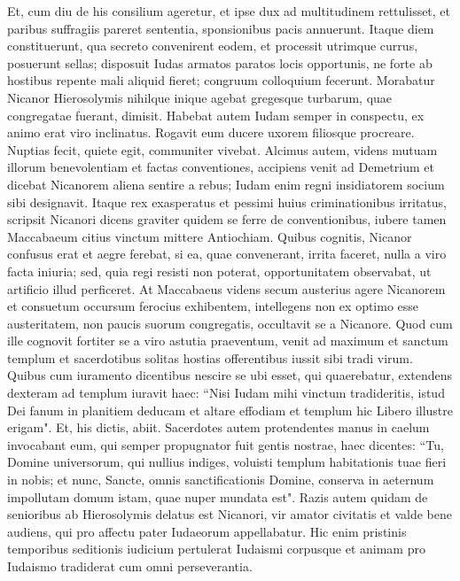 \begin{biblechapter}
\verse Et, cum diu de his consilium ageretur, et ipse dux ad multitudinem rettulisset, et paribus suffragiis pareret sententia, sponsionibus pacis annuerunt. 
\verse Itaque diem constituerunt, qua secreto convenirent eodem, et processit utrimque currus, posuerunt sellas; 
\verse disposuit Iudas armatos paratos locis opportunis, ne forte ab hostibus repente mali aliquid fieret; congruum colloquium fecerunt. 
\verse Morabatur Nicanor Hierosolymis nihilque inique agebat gregesque turbarum, quae congregatae fuerant, dimisit.  
\verse Habebat autem Iudam semper in conspectu, ex animo erat viro inclinatus.  
\verse Rogavit eum ducere uxorem filiosque procreare. Nuptias fecit, quiete egit, communiter vivebat. 
\verse Alcimus autem, videns mutuam illorum benevolentiam et factas conventiones, accipiens venit ad Demetrium et dicebat Nicanorem aliena sentire a rebus; Iudam enim regni insidiatorem socium sibi designavit. 
\verse Itaque rex exasperatus et pessimi huius criminationibus irritatus, scripsit Nicanori dicens graviter quidem se ferre de conventionibus, iubere tamen Maccabaeum citius vinctum mittere Antiochiam. 
\verse Quibus cognitis, Nicanor confusus erat et aegre ferebat, si ea, quae convenerant, irrita faceret, nulla a viro facta iniuria;  
\verse sed, quia regi resisti non poterat, opportunitatem observabat, ut artificio illud perficeret. 
\verse At Maccabaeus videns secum austerius agere Nicanorem et consuetum occursum ferocius exhibentem, intellegens non ex optimo esse austeritatem, non paucis suorum congregatis, occultavit se a Nicanore. 
\verse Quod cum ille cognovit fortiter se a viro astutia praeventum, venit ad maximum et sanctum templum et sacerdotibus solitas hostias offerentibus iussit sibi tradi virum. 
\verse Quibus cum iuramento dicentibus nescire se ubi esset, qui quaerebatur, extendens dexteram ad templum 
\verse iuravit haec: “Nisi Iudam mihi vinctum tradideritis, istud Dei fanum in planitiem deducam et altare effodiam et templum hic Libero illustre erigam". 
\verse Et, his dictis, abiit. Sacerdotes autem protendentes manus in caelum invocabant eum, qui semper propugnator fuit gentis nostrae, haec dicentes: 
\verse “Tu, Domine universorum, qui nullius indiges, voluisti templum habitationis tuae fieri in nobis; 
\verse et nunc, Sancte, omnis sanctificationis Domine, conserva in aeternum impollutam domum istam, quae nuper mundata est". 
\verse Razis autem quidam de senioribus ab Hierosolymis delatus est Nicanori, vir amator civitatis et valde bene audiens, qui pro affectu pater Iudaeorum appellabatur. 
\verse Hic enim pristinis temporibus seditionis iudicium pertulerat Iudaismi corpusque et animam pro Iudaismo tradiderat cum omni perseverantia. 

\end{biblechapter}
